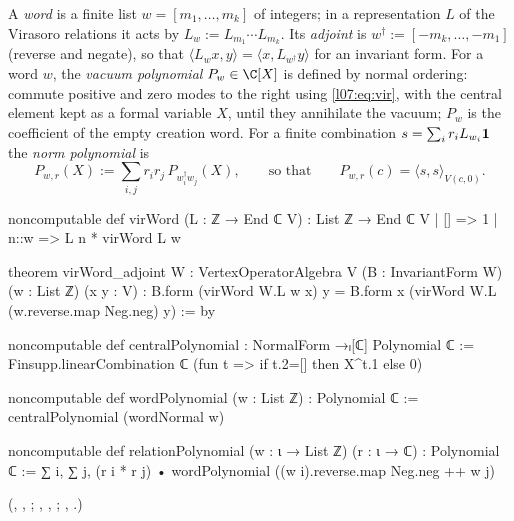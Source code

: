 \begin{definition}\label{l07:def:words}
A \emph{word} is a finite list $w = [m_1,\dots,m_k]$ of integers; in a representation $L$ of the
Virasoro relations it acts by $L_w := L_{m_1}\cdots L_{m_k}$. Its \emph{adjoint} is
$w^\dagger := [-m_k,\dots,-m_1]$ (reverse and negate), so that $\langle L_wx,y\rangle = \langle x,L_{w^\dagger}y\rangle$ for an
invariant form. For a word $w$, the \emph{vacuum polynomial} $P_w\in\C[X]$ is defined by normal
ordering: commute positive and zero modes to the right using \eqref{l07:eq:vir}, with the central
element kept as a formal variable $X$, until they annihilate the vacuum; $P_w$ is the coefficient of the
empty creation word. For a finite combination $s = \sum_ir_iL_{w_i}\mathbf{1}$ the \emph{norm polynomial} is
\begin{equation*}
 P_{w,r}(X) := \sum_{i,j}r_ir_j\,P_{w_i^\dagger w_j}(X),\qquad\text{so that}\qquad P_{w,r}(c) = \langle s,s\rangle_{V(c,0)} .
\end{equation*}
\end{definition}
\begin{leancode}
noncomputable def virWord (L : ℤ → End ℂ V) : List ℤ → End ℂ V
  | [] => 1
  | n::w => L n * virWord L w

theorem virWord_adjoint {W : VertexOperatorAlgebra V} (B : InvariantForm W)
    (w : List ℤ) (x y : V) :
    B.form (virWord W.L w x) y =
      B.form x (virWord W.L (w.reverse.map Neg.neg) y) := by

noncomputable def centralPolynomial : NormalForm →ₗ[ℂ] Polynomial ℂ :=
  Finsupp.linearCombination ℂ (fun t => if t.2=[] then X^t.1 else 0)

noncomputable def wordPolynomial (w : List ℤ) : Polynomial ℂ :=
  centralPolynomial (wordNormal w)

noncomputable def relationPolynomial (w : ι → List ℤ) (r : ι → ℂ) : Polynomial ℂ :=
  ∑ i, ∑ j, (r i * r j) • wordPolynomial ((w i).reverse.map Neg.neg ++ w j)
\end{leancode}
(, , ;
, ,
; ,
.)

